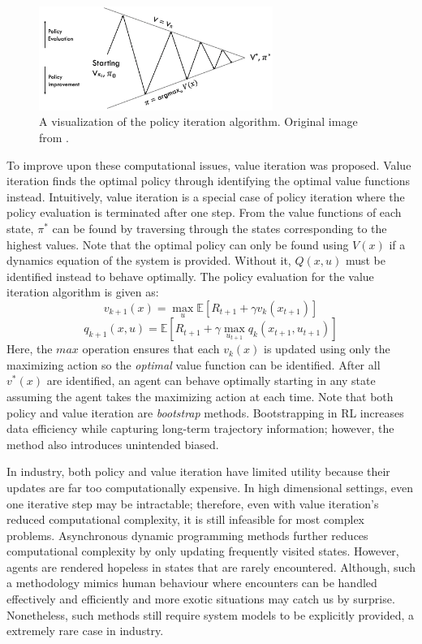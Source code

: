 \begin{figure}[H]
    \centering
    \includegraphics[width=0.68\textwidth]{images/ch1/policy_iteration.jpeg}
    \caption{A visualization of the policy iteration algorithm. Original image from \cite{silver_class}.}
    \label{fig:policy_iteration}
\end{figure}   

To improve upon these computational issues, value iteration was proposed.  Value iteration finds the optimal policy through identifying the optimal value functions instead. Intuitively, value iteration is a special case of policy iteration where the policy evaluation is terminated after one step.  From the value functions of each state, $\pi^*$ can be found by traversing through the states corresponding to the highest values. Note that the optimal policy can only be found using $V(x)$ if a dynamics equation of the system is provided. Without it, $Q(x, u)$ must be identified instead to behave optimally. The policy evaluation for the value iteration algorithm is given as:
\begin{equation}
    v_{k+1}(x) = \max_u \mathbb{E}[R_{t+1} + \gamma v_k(x_{t+1})]
\end{equation}
\begin{equation}
    q_{k+1}(x, u) = \mathbb{E}[R_{t+1} + \gamma \max_{u_{t+1}} q_k(x_{t+1}, u_{t+1})]
\end{equation}
Here, the $max$ operation ensures that each $v_k(x)$ is updated using only the maximizing action so the \textit{optimal} value function can be identified. After all $v^*(x)$ are identified, an agent can behave optimally starting in any state assuming the agent takes the maximizing action at each time. Note that both policy and value iteration are \textit{bootstrap} methods. Bootstrapping in RL increases data efficiency while capturing long-term trajectory information; however, the method also introduces unintended biased. 

In industry, both policy and value iteration have limited utility because their updates are far too computationally expensive. In high dimensional settings, even one iterative step may be intractable; therefore, even with value iteration's reduced computational complexity, it is still infeasible for most complex problems. Asynchronous dynamic programming methods further reduces computational complexity by only updating frequently visited states. However, agents are rendered hopeless in states that are rarely encountered. Although, such a methodology mimics human behaviour where encounters can be handled effectively and efficiently and more exotic situations may catch us by surprise. Nonetheless, such methods still require system models to be explicitly provided, a extremely rare case in industry.


